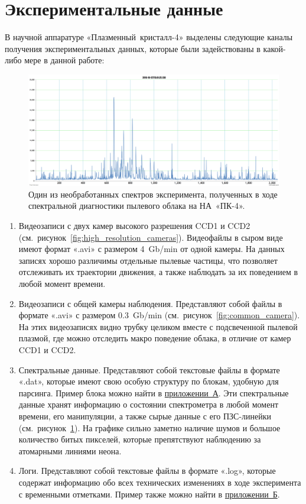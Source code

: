 \section{Экспериментальные данные}
\label{cha:ch_3_4}
В научной аппаратуре «Плазменный~кристалл-4» выделены следующие каналы получения экспериментальных данных,
которые были задействованы в какой-либо мере в данной работе:
\begin{figure}[t]
  \centering
  \includegraphics[width=16cm]{figures/raw_spectrum}
  \caption{Один из необработанных спектров эксперимента, полученных в ходе спектральной диагностики пылевого облака на НА~«ПК-4».}
  \label{fig:raw_spectrum}
\end{figure}
\begin{enumerate}
    \item Видеозаписи с двух камер высокого разрешения CCD1 и CCD2 (см.~рисунок~\ref{fig:high_resolution_cameras}).
    Видеофайлы в сыром виде имеют формат «.avi» с размером 4~Gb/min от одной камеры. На данных записях хорошо
    различимы отдельные пылевые частицы, что позволяет отслеживать их траектории движения, а также наблюдать за
    их поведением в любой момент времени.

    \item Видеозаписи с общей камеры наблюдения. Представляют собой файлы в формате «.avi» с размером 0.3~Gb/min (см.~рисунок~\ref{fig:common_camera}).
    На этих видеозаписях видно трубку целиком вместе с подсвеченной пылевой плазмой, где можно отследить макро поведение
    облака, в отличие от камер CCD1 и CCD2.

    \item Спектральные данные. Представляют собой текстовые файлы в формате «.dat», которые имеют свою особую структуру
    по блокам, удобную для парсинга. Пример блока можно найти в \hyperref[app:app1]{приложении~А}. Эти спектральные данные
    хранят информацию о состоянии спектрометра в любой момент времени, его манипуляции,
    а также сырые данные с его ПЗС-линейки (см.~рисунок~\ref{fig:raw_spectrum}). На графике сильно заметно
    наличие шумов и большое количество битых пикселей, которые препятствуют наблюдению за атомарными линиями неона.

    \item Логи. Представляют собой текстовые файлы в формате «.log», которые содержат информацию обо всех
    технических изменениях в ходе эксперимента с временными отметками. Пример также можно найти в \hyperref[app:app2]{приложении~Б}.
\end{enumerate}
